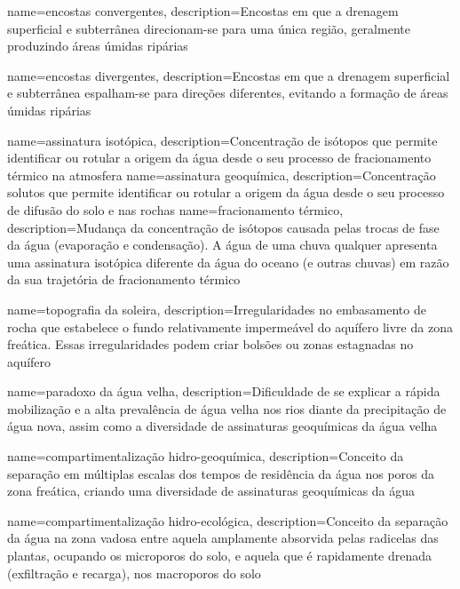 {
    name=encostas convergentes,
    description={Encostas em que a drenagem superficial e subterrânea direcionam-se para uma única região, geralmente produzindo áreas úmidas ripárias}
}

{
    name=encostas divergentes,
    description={Encostas em que a drenagem superficial e subterrânea espalham-se para direções diferentes, evitando a formação de áreas úmidas ripárias}
}

{
    name=assinatura isotópica,
    description={Concentração de isótopos que permite identificar ou rotular a origem da água desde o seu processo de fracionamento térmico na atmosfera}
}
{
    name=assinatura geoquímica,
    description={Concentração solutos que permite identificar ou rotular a origem da água desde o seu processo de difusão do solo e nas rochas}
}
{
    name=fracionamento térmico,
    description={Mudança da concentração de isótopos causada pelas trocas de fase da água (evaporação e condensação). A água de uma chuva qualquer apresenta uma assinatura isotópica diferente da água do oceano (e outras chuvas) em razão da sua trajetória de fracionamento térmico}
}

{
    name=topografia da soleira,
    description={Irregularidades no embasamento de rocha que estabelece o fundo relativamente impermeável do aquífero livre da zona freática. Essas irregularidades podem criar bolsões ou zonas estagnadas no aquífero}
}

{
    name=paradoxo da água velha,
    description={Dificuldade de se explicar a rápida mobilização e a alta prevalência de água velha nos rios diante da precipitação de água nova, assim como a diversidade de assinaturas geoquímicas da água velha}
}

{
    name=compartimentalização hidro-geoquímica,
    description={Conceito da separação em múltiplas escalas dos tempos de residência da água nos poros da zona freática, criando uma diversidade de assinaturas geoquímicas da água}
}

{
    name=compartimentalização hidro-ecológica,
    description={Conceito da separação da água na zona vadosa entre aquela amplamente absorvida pelas radicelas das plantas, ocupando os microporos do solo, e aquela que é rapidamente drenada (exfiltração e recarga), nos macroporos do solo}
}

